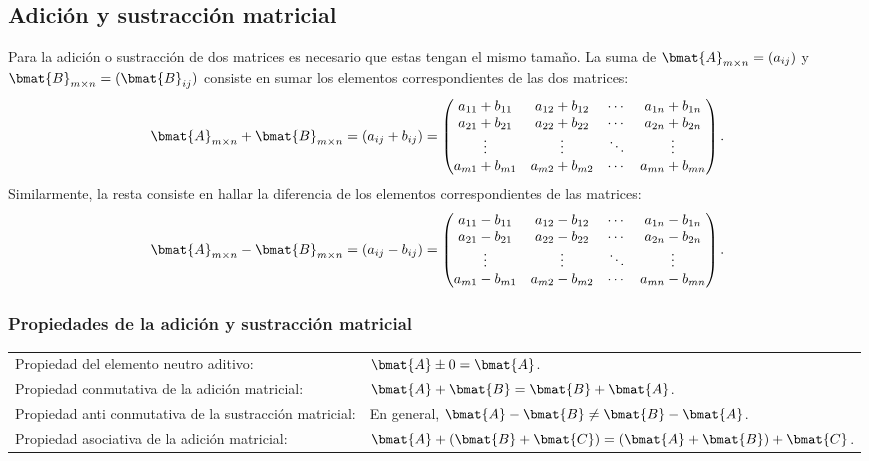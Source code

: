 \documentclass{fmbnotes}
\begin{document}
\subsection{Adición y sustracción matricial}

Para la adición o sustracción de dos matrices es necesario que estas tengan el mismo tamaño. La suma de \(\bmat{A}_{m \times n } = (a_{ij})\) y \(\bmat{B}_{m \times n } = (\bmat{B}_{ij})\) consiste en sumar los elementos correspondientes de las dos matrices:
\[\bmat{A}_{m \times n } + \bmat{B}_{m \times n } = (a_{ij}+b_{ij}) = \begin{pmatrix}
	a_{11}+b_{11} & a_{12}+b_{12} & \cdots & a_{1n}+b_{1n} \\
	a_{21}+b_{21} & a_{22}+b_{22} & \cdots & a_{2n}+b_{2n} \\
	\vdots & \vdots & \ddots & \vdots  \\
	a_{m1}+b_{m1} & a_{m2}+b_{m2} & \cdots & a_{mn}+b_{mn} \\
\end{pmatrix}.\]
Similarmente, la resta consiste en hallar la diferencia de los elementos correspondientes de las matrices:
\[\bmat{A}_{m \times n } - \bmat{B}_{m \times n } = (a_{ij}-b_{ij}) = \begin{pmatrix}
	a_{11}-b_{11} & a_{12}-b_{12} & \cdots & a_{1n}-b_{1n} \\
	a_{21}-b_{21} & a_{22}-b_{22} & \cdots & a_{2n}-b_{2n} \\
	\vdots & \vdots & \ddots & \vdots  \\
	a_{m1}-b_{m1} & a_{m2}-b_{m2} & \cdots & a_{mn}-b_{mn} \\
\end{pmatrix}.\]

\subsubsection{Propiedades de la adición y sustracción matricial}


\begin{tabular}{lp{}}
	\rule[1ex]{0pt}{2.5ex} Propiedad del elemento neutro aditivo: &  \( \bmat{A} \pm 0 = \bmat{A} \). \\
	\rule[1ex]{0pt}{2.5ex} Propiedad conmutativa de la adición matricial: &  \( \bmat{A} + \bmat{B} = \bmat{B} + \bmat{A} \).   \\
	\rule[1ex]{0pt}{2.5ex} Propiedad anti conmutativa de la sustracción matricial: &  En general, \( \bmat{A} - \bmat{B} \neq \bmat{B} - \bmat{A} \).   \\
	\rule[1ex]{0pt}{2.5ex} Propiedad asociativa de la adición matricial: &  \(\bmat{A} + (\bmat{B} + \bmat{C}) = (\bmat{A} + \bmat{B}) + \bmat{C}\).
\end{tabular}
\end{document}
